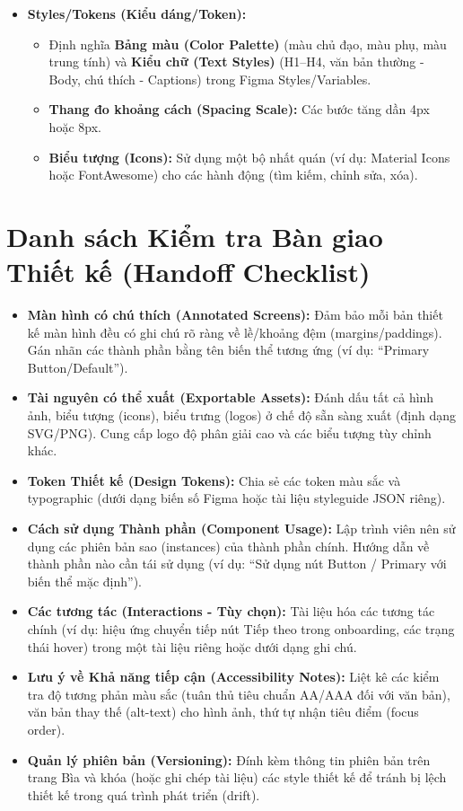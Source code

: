 \documentclass[11pt,a4paper]{article}
\begin{document}
\begin{itemize}
    \item \textbf{Styles/Tokens (Kiểu dáng/Token):}
    \begin{itemize}
        \item Định nghĩa \textbf{Bảng màu (Color Palette)} (màu chủ đạo, màu phụ, màu trung tính) và \textbf{Kiểu chữ (Text Styles)} (H1–H4, văn bản thường - Body, chú thích - Captions) trong Figma Styles/Variables.
        \item \textbf{Thang đo khoảng cách (Spacing Scale):} Các bước tăng dần 4px hoặc 8px.
        \item \textbf{Biểu tượng (Icons):} Sử dụng một bộ nhất quán (ví dụ: Material Icons hoặc FontAwesome) cho các hành động (tìm kiếm, chỉnh sửa, xóa).
    \end{itemize}
\end{itemize}

\section{Danh sách Kiểm tra Bàn giao Thiết kế (Handoff Checklist)}

\begin{itemize}
    \item \textbf{Màn hình có chú thích (Annotated Screens):} Đảm bảo mỗi bản thiết kế màn hình đều có ghi chú rõ ràng về lề/khoảng đệm (margins/paddings). Gán nhãn các thành phần bằng tên biến thể tương ứng (ví dụ: ``Primary Button/Default'').
    \item \textbf{Tài nguyên có thể xuất (Exportable Assets):} Đánh dấu tất cả hình ảnh, biểu tượng (icons), biểu trưng (logos) ở chế độ sẵn sàng xuất (định dạng SVG/PNG). Cung cấp logo độ phân giải cao và các biểu tượng tùy chỉnh khác.
    \item \textbf{Token Thiết kế (Design Tokens):} Chia sẻ các token màu sắc và typographic (dưới dạng biến số Figma hoặc tài liệu styleguide JSON riêng).
    \item \textbf{Cách sử dụng Thành phần (Component Usage):} Lập trình viên nên sử dụng các phiên bản sao (instances) của thành phần chính. Hướng dẫn về thành phần nào cần tái sử dụng (ví dụ: ``Sử dụng nút Button / Primary với biến thể mặc định'').
    \item \textbf{Các tương tác (Interactions - Tùy chọn):} Tài liệu hóa các tương tác chính (ví dụ: hiệu ứng chuyển tiếp nút Tiếp theo trong onboarding, các trạng thái hover) trong một tài liệu riêng hoặc dưới dạng ghi chú.
    \item \textbf{Lưu ý về Khả năng tiếp cận (Accessibility Notes):} Liệt kê các kiểm tra độ tương phản màu sắc (tuân thủ tiêu chuẩn AA/AAA đối với văn bản), văn bản thay thế (alt-text) cho hình ảnh, thứ tự nhận tiêu điểm (focus order).
    \item \textbf{Quản lý phiên bản (Versioning):} Đính kèm thông tin phiên bản trên trang Bìa và khóa (hoặc ghi chép tài liệu) các style thiết kế để tránh bị lệch thiết kế trong quá trình phát triển (drift).
\end{itemize}
\end{document}
